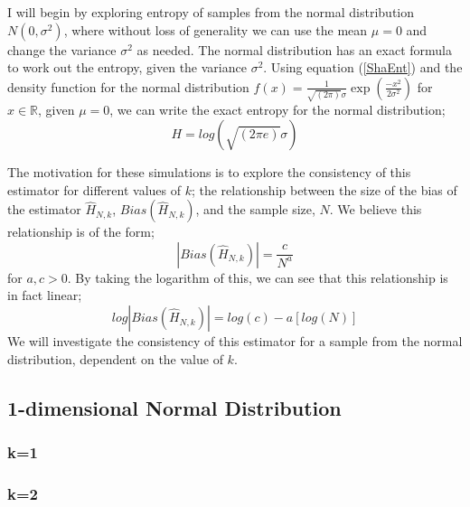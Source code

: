 \documentclass{article}
\begin{document}
I will begin by exploring entropy of samples from the normal distribution $N(0, \sigma^2)$, where without loss of generality we can use the mean $\mu = 0$ and change the variance $\sigma^2$ as needed. The normal distribution has an exact formula to work out the entropy, given the variance $\sigma^2$. Using equation (\ref{ShaEnt}) and the density function for the normal distribution $f(x) = \frac{1}{\sqrt{(2\pi)} \sigma}\exp{ \left( \frac{-x^2}{2\sigma^2} \right)}$ for $x \in \mathbb{R}$, given $\mu = 0$, we can write the exact entropy for the normal distribution;
\begin{equation}
H = log(\sqrt{(2\pi e)}\sigma)
\end{equation}

The motivation for these simulations is to explore the consistency of this estimator for different values of $k$; the relationship between the size of the bias of the estimator $\hat{H}_{N, k}$, $Bias(\hat{H}_{N, k})$,  and the sample size, $N$. We believe this relationship is of the form;
\begin{equation}
|Bias(\hat{H}_{N, k})| = \frac{c}{N^a}
\end{equation}
for $a, c > 0$. By taking the logarithm of this, we can see that this relationship is in fact linear;
\begin{equation}
log|Bias(\hat{H}_{N, k})| = log(c) - a [log(N)]
\end{equation}
We will investigate the consistency of this estimator for a sample from the normal distribution, dependent on the value of $k$.

\subsection{1-dimensional Normal Distribution}

\subsubsection{k=1}


\subsubsection{k=2}
\end{document}
